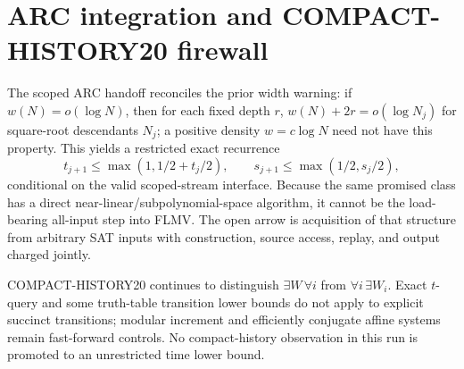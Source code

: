 \documentclass[11pt]{article}
\begin{document}
\section*{ARC integration and COMPACT-HISTORY20 firewall}
The scoped ARC handoff reconciles the prior width warning: if
$w(N)=o(\log N)$, then for each fixed depth $r$,
$w(N)+2r=o(\log N_j)$ for square-root descendants $N_j$; a positive density
$w=c\log N$ need not have this property.  This yields a restricted exact
recurrence
\[
t_{j+1}\leq\max(1,1/2+t_j/2),\qquad
s_{j+1}\leq\max(1/2,s_j/2),
\]
conditional on the valid scoped-stream interface.  Because the same promised
class has a direct near-linear/subpolynomial-space algorithm, it cannot be the
load-bearing all-input step into FLMV.  The open arrow is acquisition of that
structure from arbitrary SAT inputs with construction, source access, replay,
and output charged jointly.

COMPACT-HISTORY20 continues to distinguish $\exists W\,\forall i$ from
$\forall i\,\exists W_i$.  Exact $t$-query and some truth-table transition
lower bounds do not apply to explicit succinct transitions; modular increment
and efficiently conjugate affine systems remain fast-forward controls.  No
compact-history observation in this run is promoted to an unrestricted time
lower bound.
\end{document}
